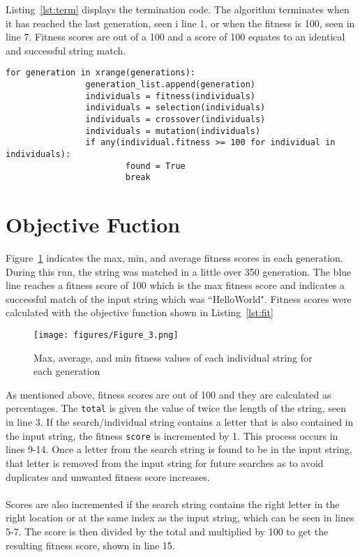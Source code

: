 \documentclass[conference]{IEEEtrans}
\begin{document}
Listing~\ref{lst:term} displays the termination code.  The algorithm terminates
when it has reached the last generation, seen i line 1, or when the fitness is
100, seen in line 7.  Fitness scores are out of a 100 and a score of 100 equates
to an identical and successful string match.

\begin{lstlisting}[caption={Termination}, label={lst:term}]
 for generation in xrange(generations):
                generation_list.append(generation)
                individuals = fitness(individuals)
                individuals = selection(individuals)
                individuals = crossover(individuals)
                individuals = mutation(individuals)
                if any(individual.fitness >= 100 for individual in individuals):
                        found = True
                        break
\end{lstlisting}

\section{Objective Fuction}

Figure~\ref{fig:fitness} indicates the max, min, and average fitness scores in
each generation.  During this run, the string was matched in a little over 350
generation.  The blue line reaches a fitness score of 100 which is the max
fitness score and indicates a successful match of the input string which was
``HelloWorld".  Fitness scores were calculated with the objective function shown
in Listing~\ref{lst:fit}

\begin{figure}[H]
        \centering
        \texttt{[image: figures/Figure\_3.png]}
        \caption{Max, average, and min fitness values of each individual string
for each generation}
        \label{fig:fitness}
\end{figure}

As mentioned above, fitness scores are out of 100 and they are calculated as
percentages.  The \texttt{total} is given the value of twice the length of the
string, seen in line 3.  If the search/individual string contains a letter that
is also contained in the input string, the fitness \texttt{score} is incremented
by 1.  This process occurs in lines 9-14.  Once a letter from the search string
is found to be in the input string, that letter is removed from the input string
for future searches as to avoid duplicates and unwanted fitness score
increases.  
\\ \\
Scores are also incremented if the
search string contains the right letter in the right location or at the same
index as the input string, which can be seen in lines 5-7. The score is then
divided by the total and multiplied by 100 to get the resulting fitness score,
shown in line 15.
\end{document}
